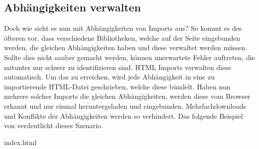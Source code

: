 \begin{Shaded}
\begin{Highlighting}[]
  \KeywordTok{>}
     \OperatorTok{=} \NormalTok{(}\OperatorTok{;}
     \OperatorTok{=} \NormalTok{(}\NormalTok{)}\OperatorTok{;}
    \NormalTok{(}\NormalTok{(}\NormalTok{))}\OperatorTok{;}
  \OperatorTok{<}
\OperatorTok{>}
\end{Highlighting}
\end{Shaded}



\subsection{Abhängigkeiten verwalten}\label{abhuxe4ngigkeiten-verwalten}

Doch wie sieht es nun mit Abhängigkeiten von Imports aus? So kommt es des öfteren vor, dass verschiedene Bibliotheken, welche auf der Seite eingebunden werden, die gleichen Abhängigkeiten haben und diese verwaltet werden müssen. Sollte dies nicht sauber gemacht werden, können unerwartete Fehler auftreten, die mitunter nur schwer zu identifizieren sind. HTML Imports verwalten diese automatisch. Um das zu erreichen, wird jede Abhängigkeit in eine zu importierende HTML-Datei geschrieben, welche diese bündelt. Haben nun mehrere solcher Imports die gleichen Abhängigkeiten, werden diese vom Browser erkannt und nur einmal heruntergeladen und eingebunden. Mehrfachdownloads und Konflikte der Abhängigkeiten werden so verhindert. Das folgende Beispiel von \cite{citeulike:13853700} verdeutlicht dieses Szenario.

index.html
\begin{Shaded}
\begin{Highlighting}[]
\KeywordTok{>}
\KeywordTok{>}
\end{Highlighting}
\end{Shaded}

